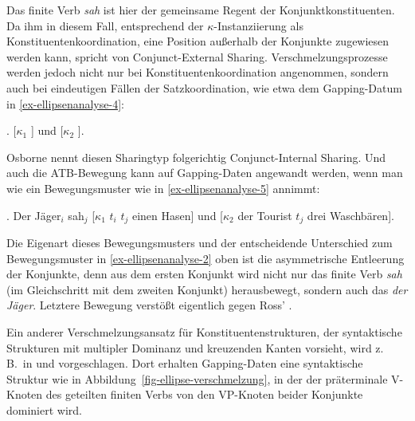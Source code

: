 \largerpage[1.7]
Das finite Verb {\it sah} ist hier der gemeinsame Regent der Konjunktkonstituenten. Da ihm in diesem Fall, entsprechend der $\kappa$-Instanziierung als Konstituentenkoordination, eine Position au\ss erhalb der Konjunkte zugewiesen werden kann, spricht \cite{Osborne:08} von Conjunct-External Sharing. Verschmelzungsprozesse werden jedoch nicht nur bei Konstituentenkoordination angenommen, sondern auch  bei eindeutigen Fällen der Satzkoordination, wie etwa dem Gapping-Datum in \ref{ex-ellipsenanalyse-4}:  

\vspace{5ex}

\ex.\label{ex-ellipsenanalyse-4} [$\kappa_1$   ] und [$\kappa_2$  ].

Osborne nennt diesen Sharingtyp folgerichtig Conjunct-Internal Sharing. Und auch die ATB-Bewegung kann auf Gapping-Daten angewandt werden, wenn man wie \cite{Johnson:04,Johnson:09} ein Bewegungsmuster wie in \ref{ex-ellipsenanalyse-5} annimmt:

\ex. \label{ex-ellipsenanalyse-5} Der Jäger$_i$ sah$_j$ [$\kappa_1$ $t_i$ $t_j$ einen Hasen] und [$\kappa_2$ der Tourist $t_j$ drei Waschbären].

Die Eigenart dieses Bewegungsmusters und der entscheidende Unterschied zum Bewegungsmuster in \ref{ex-ellipsenanalyse-2} oben ist die asymmetrische Entleerung der Konjunkte, denn aus dem ersten Konjunkt wird nicht nur das finite Verb {\it sah} (im Gleichschritt mit dem zweiten Konjunkt) herausbewegt, sondern auch das  {\it der Jäger}. Letztere Bewegung verstö\ss t eigentlich gegen Ross'  \citep[161]{Ross:67}. 
  
Ein anderer Verschmelzungsansatz für Konstituentenstrukturen, der syntaktische Strukturen mit multipler Dominanz und kreuzenden Kanten vorsieht, wird z.\,B.\ in \cite{McCawley:82} und \cite{Wilder:99,Wilder:08} vorgeschlagen. Dort erhalten Gapping-Daten eine syntaktische Struktur wie in Abbildung~\ref{fig-ellipse-verschmelzung}, in der der präterminale V-Knoten des geteilten finiten Verbs von den VP-Knoten beider Konjunkte dominiert wird. 

